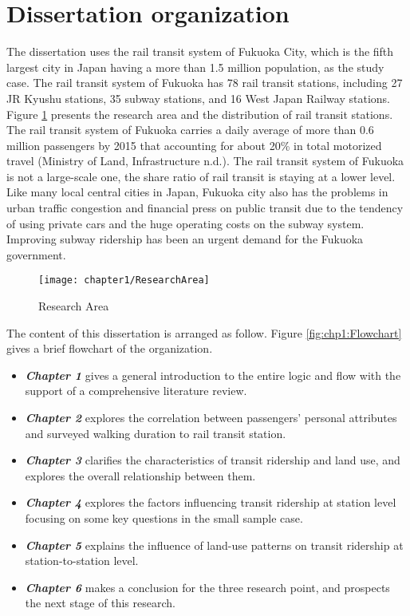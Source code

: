 %
\section{Dissertation organization}
The dissertation uses the rail transit system of Fukuoka City, which is the fifth largest city in Japan having a more than 1.5 million population, as the study case. The rail transit system of Fukuoka has 78 rail transit stations, including 27 JR Kyushu stations, 35 subway stations, and 16 West Japan Railway stations. Figure \ref{fig:chp1:ResearchArea} presents the research area and the distribution of rail transit stations. The rail transit system of Fukuoka carries a daily average of more than 0.6 million passengers by 2015 that accounting for about 20\% in total motorized travel (Ministry of Land, Infrastructure n.d.). The rail transit system of Fukuoka is not a large-scale one, the share ratio of rail transit is staying at a lower level. Like many local central cities in Japan, Fukuoka city also has the problems in urban traffic congestion and financial press on public transit due to the tendency of using private cars and the huge operating costs on the subway system. Improving subway ridership has been an urgent demand for the Fukuoka government.

\begin{figure}[htbp]
	\centering
	\texttt{[image: chapter1/ResearchArea]}
	\caption{Research Area}
	\label{fig:chp1:ResearchArea}
\end{figure}

The content of this dissertation is arranged as follow. Figure \ref{fig:chp1:Flowchart} gives a brief flowchart of the organization.

\begin{itemize}
	\item \emph{\textbf{Chapter 1}} gives a general introduction to the entire logic and flow with the support of a comprehensive literature review.
	\item \emph{\textbf{Chapter 2}} explores the correlation between passengers' personal attributes and surveyed walking duration to rail transit station.
	\item \emph{\textbf{Chapter 3}} clarifies the characteristics of transit ridership and land use, and explores the overall relationship between them.
	\item \emph{\textbf{Chapter 4}} explores the factors influencing transit ridership at station level focusing on some key questions in the small sample case.
	\item \emph{\textbf{Chapter 5}} explains the influence of land-use patterns on transit ridership at station-to-station level.
	\item \emph{\textbf{Chapter 6}} makes a conclusion for the three research point, and prospects the next stage of this research.
\end{itemize}

